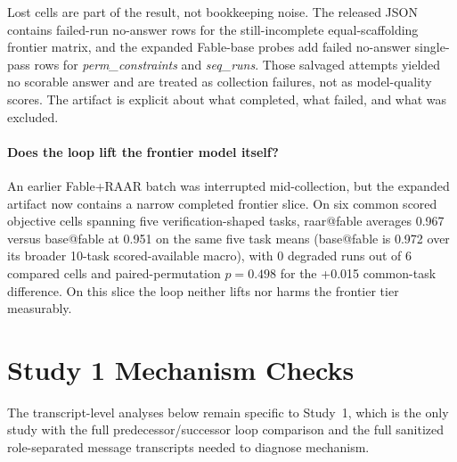 \documentclass[journal]{IEEEtran}
\newcommand{\method}{RAAR}
\begin{document}
Lost cells are part of the result, not bookkeeping noise. The released JSON
contains failed-run no-answer rows for the still-incomplete equal-scaffolding
frontier matrix, and the expanded Fable-base probes add failed no-answer
single-pass rows for \emph{perm\_constraints} and \emph{seq\_runs}. Those
salvaged attempts yielded no scorable answer and are treated as collection
failures, not as model-quality scores. The artifact is explicit about what
completed, what failed, and what was excluded.

\paragraph*{Does the loop lift the frontier model itself?}
An earlier Fable+\method{} batch was interrupted mid-collection, but the
expanded artifact now contains a narrow completed frontier slice. On six
common scored objective cells spanning five verification-shaped tasks,
raar@fable averages 0.967 versus base@fable at 0.951 on the same five task
means (base@fable is 0.972 over its broader 10-task scored-available macro),
with 0 degraded runs out of 6 compared cells and paired-permutation
$p{=}0.498$ for the +0.015 common-task difference. On this slice the loop
neither lifts nor harms the frontier tier measurably.

\section{Study 1 Mechanism Checks}
\label{sec:analysis}
The transcript-level analyses below remain specific to Study~1, which is the
only study with the full predecessor/successor loop comparison and the
full sanitized role-separated message transcripts needed to diagnose
mechanism.
\end{document}
